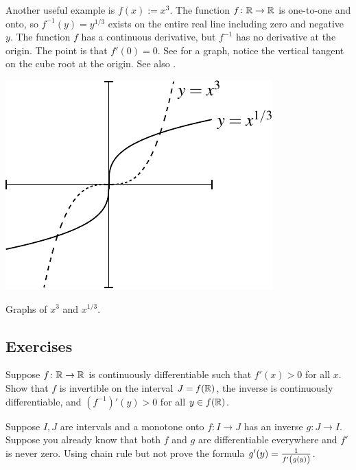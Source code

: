 \begin{example}
Another useful example is $f(x) := x^3$.  The function $f \colon {\mathbb{R}} \to {\mathbb{R}}$ is
one-to-one and onto, so $f^{-1}(y) = y^{1/3}$ exists on the entire real
line including zero and negative $y$.  The function $f$ has
a continuous derivative, but $f^{-1}$ has no derivative at the origin.  The
point is that $f'(0) = 0$.  See  for a graph,
notice the vertical tangent on the cube root at the origin.
See also .
\begin{myfigureht}
\includegraphics{figures/cubecuberoot}
\caption{Graphs of $x^3$ and $x^{1/3}$.\label{cubecuberootfig}}
\end{myfigureht}
\end{example}


\subsection{Exercises}

\begin{exercise}
Suppose $f \colon {\mathbb{R}} \to {\mathbb{R}}$ is continuously differentiable such that
$f'(x) > 0$ for all $x$.  Show that $f$ is invertible on the interval $J =
f({\mathbb{R}})$, the inverse is continuously differentiable, and ${(f^{-1})}'(y) >
0$ for all $y \in f({\mathbb{R}})$.
\end{exercise}

\begin{exercise}
Suppose $I,J$ are intervals and a monotone onto $f \colon I \to J$ has an inverse $g \colon J \to I$.
Suppose you already know that both $f$ and $g$ are differentiable
everywhere and $f'$ is never zero.  Using chain rule but not  prove the
formula $g'(y) = \frac{1}{f'\left(\vphantom{1_1^1}g(y)\right)}$. %
\end{exercise}

